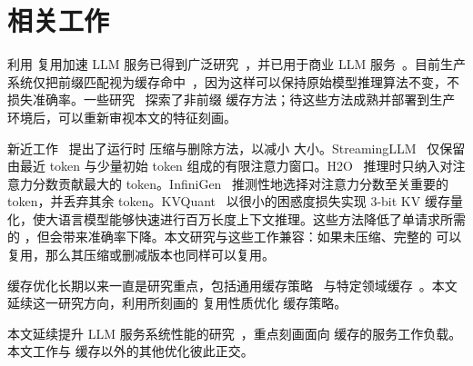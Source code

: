\section{相关工作}
\label{sec:related}

利用 {\kvcache} 复用加速 LLM 服务已得到广泛研究~\cite{vllm,chunkattention,cachedattention,promptcache,sglang,cacheblend}，并已用于商业 LLM 服务~\cite{openaiapi,genimiapi,claudeapi,mooncake}。目前生产系统仅把前缀匹配视为缓存命中~\cite{chunkattention,sglang,cachedattention,openaiapi,genimiapi,claudeapi,mooncake}，因为这样可以保持原始模型推理算法不变，不损失准确率。一些研究~\cite{promptcache,cacheblend,hu2024epic} 探索了非前缀 {\kvcache} 缓存方法；待这些方法成熟并部署到生产环境后，可以重新审视本文的特征刻画。

新近工作~\cite{streamingllm,h2o,infinigen,pyramidkv} 提出了运行时 {\kvcache} 压缩与删除方法，以减小 {\kvcache} 大小。StreamingLLM~\cite{streamingllm} 仅保留由最近 token 与少量初始 token 组成的有限注意力窗口。H2O~\cite{h2o} 推理时只纳入对注意力分数贡献最大的 token。InfiniGen~\cite{infinigen} 推测性地选择对注意力分数至关重要的 token，并丢弃其余 token。KVQuant~\cite{KVQuant} 以很小的困惑度损失实现 3-bit KV 缓存量化，使大语言模型能够快速进行百万长度上下文推理。这些方法降低了单请求所需的 {\kvcache}，但会带来准确率下降。本文研究与这些工作兼容：如果未压缩、完整的 {\kvcache} 可以复用，那么其压缩或删减版本也同样可以复用。

缓存优化长期以来一直是研究重点，包括通用缓存策略~\cite{lruk,slru,twoq,eelru,lrfu,lirs,arc,mq,car,clockpro,DBLP:journals/tos/EinzigerEFM22,lhd,cacheus,sieve,cherkasova1998improving} 与特定领域缓存~\cite{yang2020twemcache,berg2020cachelib,icebreaker,fasscache}。本文延续这一研究方向，利用所刻画的 {\kvcache} 复用性质优化 {\kvcache} 缓存策略。

本文延续提升 LLM 服务系统性能的研究~\cite{DBLP:conf/osdi/ZhongLCHZL0024,DBLP:journals/corr/abs-2404-09526,DBLP:conf/sosp/KwonLZ0ZY0ZS23,alpaserve,DBLP:conf/osdi/YuJKKC22,DBLP:conf/isca/PatelCZSGMB24,cachedattention,DBLP:journals/corr/abs-2412-17246}，重点刻画面向 {\kvcache} 缓存的服务工作负载。本文工作与 {\kvcache} 缓存以外的其他优化彼此正交。
